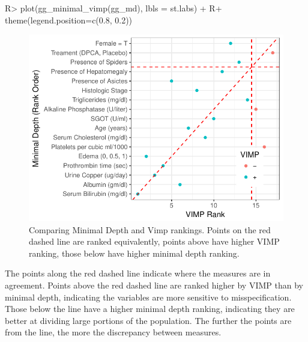 \documentclass[article]{jss}
\begin{document}
\begin{Schunk}
\begin{Sinput}
R> plot(gg_minimal_vimp(gg_md), lbls = st.labs) +
R+   theme(legend.position=c(0.8, 0.2))
\end{Sinput}
\begin{figure}[!htb]

{\centering \includegraphics{rfs-depthVimp-1} 

}

\caption[Comparing Minimal Depth and Vimp rankings]{Comparing Minimal Depth and Vimp rankings. Points on the red dashed line are ranked equivalently, points above have higher VIMP ranking, those below have higher minimal depth ranking.}\label{fig:depthVimp}
\end{figure}
\end{Schunk}

The points along the red dashed line indicate where the measures are in
agreement. Points above the red dashed line are ranked higher by VIMP
than by minimal depth, indicating the variables are more sensitive to
misspecification. Those below the line have a higher minimal depth
ranking, indicating they are better at dividing large portions of the
population. The further the points are from the line, the more the
discrepancy between measures.
\end{document}
